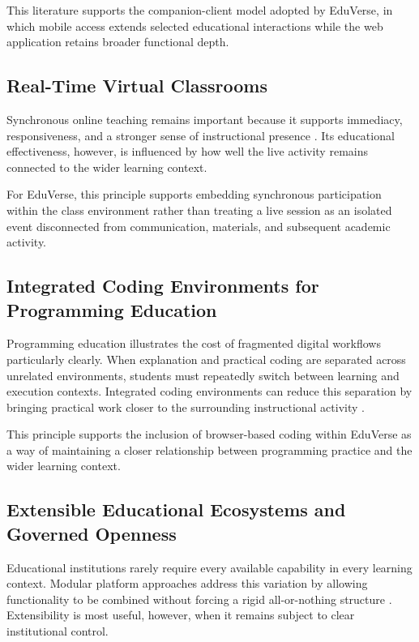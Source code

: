 This literature supports the companion-client model adopted by EduVerse, in
which mobile access extends selected educational interactions while the web
application retains broader functional depth.

\subsection{Real-Time Virtual Classrooms}
\label{subsec:real_time_virtual_classrooms}

Synchronous online teaching remains important because it supports immediacy,
responsiveness, and a stronger sense of instructional presence
\cite{lee2024synchronous}. Its educational effectiveness, however, is
influenced by how well the live activity remains connected to the wider
learning context.

For EduVerse, this principle supports embedding synchronous participation
within the class environment rather than treating a live session as an isolated
event disconnected from communication, materials, and subsequent academic
activity.

\subsection{Integrated Coding Environments for Programming Education}
\label{subsec:integrated_coding_environments_programming_education}

Programming education illustrates the cost of fragmented digital workflows
particularly clearly. When explanation and practical coding are separated
across unrelated environments, students must repeatedly switch between learning
and execution contexts. Integrated coding environments can reduce this
separation by bringing practical work closer to the surrounding instructional
activity \cite{noor2023ide}.

This principle supports the inclusion of browser-based coding within EduVerse
as a way of maintaining a closer relationship between programming practice and
the wider learning context.

\subsection{Extensible Educational Ecosystems and Governed Openness}
\label{subsec:extensible_ecosystems_governed_openness}

Educational institutions rarely require every available capability in every
learning context. Modular platform approaches address this variation by
allowing functionality to be combined without forcing a rigid all-or-nothing
structure \cite{sorkun2022modularity}. Extensibility is most useful, however,
when it remains subject to clear institutional control.

